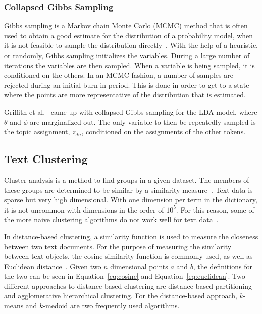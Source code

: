 \subsubsection{Collapsed Gibbs Sampling}

Gibbs sampling is a Markov chain Monte Carlo (MCMC) method that is often used to obtain a good estimate for the distribution of a probability model, when it is not feasible to sample the distribution directly~\cite{crain2012dimensionality}.
With the help of a heuristic, or randomly, Gibbs sampling initializes the variables.
During a large number of iterations the variables are then sampled.
When a variable is being sampled, it is conditioned on the others.
In an MCMC fashion, a number of samples are rejected during an initial burn-in period.
This is done in order to get to a state where the points are more representative of the distribution that is estimated.

Griffith et al\@.~\cite{griffiths2004finding} came up with collapsed Gibbs sampling for the LDA model, where $\theta$ and $\phi$ are marginalized out.
The only variable to then be repeatedly sampled is the topic assignment, $z_{dn}$, conditioned on the assignments of the other tokens.

\subsection{Text Clustering}

Cluster analysis is a method to find groups in a given dataset.
The members of these groups are determined to be similar by a similarity measure~\cite{kaufman2009finding, aggarwal2012survey}.
Text data is sparse but very high dimensional.
With one dimension per term in the dictionary, it is not uncommon with dimensions in the order of $10^5$.
For this reason, some of the more naive clustering algorithms do not work well for text data~\cite{aggarwal2012survey}.

In distance-based clustering, a similarity function is used to measure the closeness between two text documents.
For the purpose of measuring the similarity between text objects, the cosine similarity function is commonly used, as well as Euclidean distance~\cite{aggarwal2012survey}.
Given two $n$ dimensional points $a$ and $b$, the definitions for the two can be seen in Equation~\ref{eq:cosine} and Equation~\ref{eq:euclidean}.
Two different approaches to distance-based clustering are distance-based partitioning and agglomerative hierarchical clustering.
For the distance-based approach, $k$-means and $k$-medoid are two frequently used algorithms.

